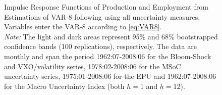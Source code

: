\documentclass[a4paper,11pt,listof=nochaptergap,oneside,pointednumbers,bibtotoc,bigheadings,liststotoc]{scrbook}
\theoremstyle{mysatz}
\theoremstyle{mydefinition}
\theoremstyle{mybemerkung}
\begin{document}
\begin{figure}[!h]
   \centering
   \setlength\fboxsep{0pt}
   \setlength\fboxrule{0pt}
      \caption[Impulse Response Functions of Production and Employment from Estimations of VAR-8 following \citet{bloom:09} using all uncertainty measures.]{Impulse Response Functions of Production and Employment from Estimations of VAR-8 following \citet{bloom:09} using all uncertainty measures. Variables enter the VAR-8 according to \ref{eq:VAR8}.\\
      \textit{Note:}  The light and dark areas represent 95\% and 68\% bootstrapped confidence bands (100 replications), respectively. The data are monthly and span the period 1962:07-2008:06 for the Bloom-Shock and VXO/volatility series, 1978:02-2008:06 for the MSoC uncertainty series, 1975:01-2008:06 for the EPU and 1962:07-2008:06 for the Macro Uncertainty Index (both $h=1$ and $h=12$).}   \label{fig:VAR8_HP_until2008}
\end{figure}
\end{document}
